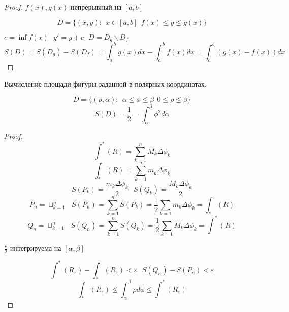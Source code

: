 \begin{proof}
  $f(x),g(x)$ непрерывный на $[a,b]$

  $$
  D = \{ (x,y): ~~ x \in [a,b] ~~ f(x) \le y \le g(x) \}
  $$

  $c = \inf f(x) ~~~ y' = y + c ~~~ D = D_g \backslash D_f$
  $$
  S(D) = S(D_g) - S(D_f) = \int_a^b g(x)dx - \int_a^b f(x)dx =
  \int_a^b (g(x) - f(x)) dx
  $$
\end{proof}

\begin{title}[\Large]
  Вычисление площади фигуры заданной в полярных координатах.
\end{title}

\begin{theorem}
  $$
  D = \{ (\rho,\alpha): ~~ \alpha \le \phi \le \beta ~~ 0 \le
  \rho \le \beta \}
  $$
  $$
  S(D) = \frac{1}{2} = \int_{\alpha}^{\beta} \phi^2 d\alpha
  $$
\end{theorem}

\begin{proof}
  $$
  \int^* (R) = \sum_{k=1}^n M_k \Delta \phi_k
  $$
  $$
  \int_* (R) = \sum_{k=1}^n m_k \Delta \phi_k
  $$
  $$
  S(P_k) = \frac{m_k \Delta \phi_k}{2} ~~~
  S(Q_k) = \frac{M_k \Delta \phi_k}{2}
  $$
  $$
  P_n = \sqcup_{k=1}^n ~~~
  S(P_n) = \sum_{k=1}^n S(P_k) = \frac{1}{2} \sum_{k=1} m_k \Delta \phi_k =
  \int_* (R)
  $$
  $$
  Q_n = \sqcup_{k=1}^n ~~~
  S(Q_n) = \sum_{k=1}^n S(Q_k) = \frac{1}{2} \sum_{k=1} M_k \Delta \phi_k =
  \int^* (R)
  $$

  $\frac{\rho}{2}$ интегрируема на $[\alpha, \beta]$

  $$
  \int^* (R_{\varepsilon}) - \int_* (R_{\varepsilon}) < \varepsilon ~~~
  S(Q_n) - S(P_n) < \varepsilon
  $$
  $$
  \int_* (R_{\varepsilon}) \le \int_{\alpha}^{\beta} \rho d\phi \le
  \int^* (R_{\varepsilon})
  $$
\end{proof}